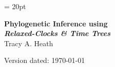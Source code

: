 \documentclass[11pt]{article}
\begin{document}
\renewcommand{\headrulewidth}{0.5pt}
\headsep = 20pt
\lhead{ }
\thispagestyle{plain}
\begin{center}

\textbf{\LARGE Phylogenetic Inference using \RevBayes}\\\vspace{2mm}
\textbf{\it{\Large Relaxed-Clocks \& Time Trees}}\\\vspace{2mm}
\vspace{1cm}
{\Large Tracy A. Heath}
\vspace{1cm}


\end{center}

\def \ResourcePath {./}
\def \GlobalResourcePath {../}


Version dated: \today
\end{document}
